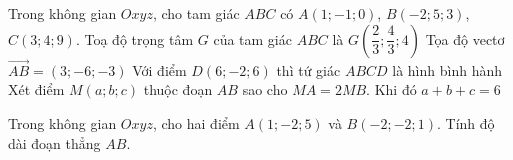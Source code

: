 \begin{ex}%
	Trong không gian $Oxyz$, cho tam giác $ABC$ có $A\left( 1; -1; 0 \right)$, $B\left( -2; 5;  3 \right)$, $C\left( 3; 4; 9 \right)$.
	 \choiceTF
		{Toạ độ trọng tâm $G$  của tam giác $ABC$ là $G\left( \dfrac{2}{3}; \dfrac{4}{3};4 \right)$}
		{Tọa độ vectơ $\overrightarrow{AB}=\left( 3;  -6; -3 \right)$}
		{\True Với  điểm $D\left( 6; -2; 6 \right)$ thì tứ giác $ABCD$ là hình bình hành}
		{Xét điểm $M\left( a; b; c \right)$ thuộc  đoạn $AB$ sao cho $MA=2MB$. Khi đó $a+b+c=6$}
\end{ex}



\begin{bt}%
	Trong không gian $Oxyz$, cho hai điểm $A(1;-2;5)$ và $B(-2;-2;1)$. Tính  độ dài đoạn thẳng $AB$.
\end{bt}


